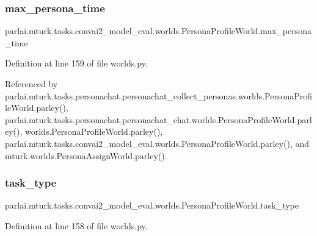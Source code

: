 \subsubsection{\texorpdfstring{max\+\_\+persona\+\_\+time}{max\_persona\_time}}
{\footnotesize\ttfamily parlai.\+mturk.\+tasks.\+convai2\+\_\+model\+\_\+eval.\+worlds.\+Persona\+Profile\+World.\+max\+\_\+persona\+\_\+time}



Definition at line 159 of file worlds.\+py.



Referenced by parlai.\+mturk.\+tasks.\+personachat.\+personachat\+\_\+collect\+\_\+personas.\+worlds.\+Persona\+Profile\+World.\+parley(), parlai.\+mturk.\+tasks.\+personachat.\+personachat\+\_\+chat.\+worlds.\+Persona\+Profile\+World.\+parley(), worlds.\+Persona\+Profile\+World.\+parley(), parlai.\+mturk.\+tasks.\+convai2\+\_\+model\+\_\+eval.\+worlds.\+Persona\+Profile\+World.\+parley(), and mturk.\+worlds.\+Persona\+Assign\+World.\+parley().

\mbox{\label{classparlai_1_1mturk_1_1tasks_1_1convai2__model__eval_1_1worlds_1_1PersonaProfileWorld_af482933a082195bce55b2e1aa9acc655}} 
\subsubsection{\texorpdfstring{task\+\_\+type}{task\_type}}
{\footnotesize\ttfamily parlai.\+mturk.\+tasks.\+convai2\+\_\+model\+\_\+eval.\+worlds.\+Persona\+Profile\+World.\+task\+\_\+type}



Definition at line 158 of file worlds.\+py.



